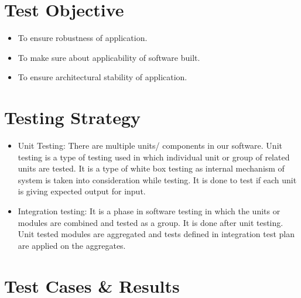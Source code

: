 \documentclass[oneside,a4paper,12pt]{book}
\begin{document}
\section{Test Objective}
\begin{itemize}
    \item To ensure robustness of application.
    \item To make sure about applicability of software built.
    \item To ensure architectural stability of application.
\end{itemize}

\section{Testing Strategy}

\begin{itemize}
\item Unit Testing: There are multiple units/ components in our software. Unit testing is a type of testing used in which individual unit or group of related units are tested. It is a type of white box testing as internal mechanism of system is taken into consideration while testing. It is done to test if each unit is giving expected output for input. \par

\setlength{\parskip}{9.96pt}
	\item Integration testing: It is a phase in software testing in which the units or modules are combined and tested as a group. It is done after unit testing. Unit tested modules are aggregated and tests deﬁned in integration test plan are applied on the aggregates.\par
\end{itemize}

\section{Test Cases \& Results}
\end{document}
